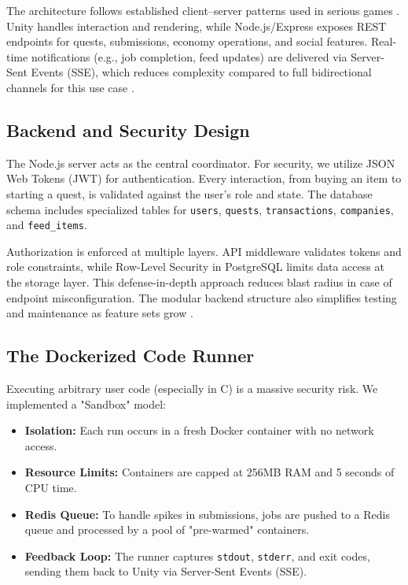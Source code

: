 \documentclass[a4paper, UKenglish, cleveref, autoref, thm-restate]{oasics-v2021}
\begin{document}
The architecture follows established client--server patterns used in serious games \cite{khan2010clientserver}. Unity handles interaction and rendering, while Node.js/Express exposes REST endpoints for quests, submissions, economy operations, and social features. Real-time notifications (e.g., job completion, feed updates) are delivered via Server-Sent Events (SSE), which reduces complexity compared to full bidirectional channels for this use case \cite{torre2019sse}.

\subsection{Backend and Security Design}
The Node.js server acts as the central coordinator. For security, we utilize JSON Web Tokens (JWT) for authentication. Every interaction, from buying an item to starting a quest, is validated against the user's role and state. The database schema includes specialized tables for \texttt{users}, \texttt{quests}, \texttt{transactions}, \texttt{companies}, and \texttt{feed\_items}.

Authorization is enforced at multiple layers. API middleware validates tokens and role constraints, while Row-Level Security in PostgreSQL limits data access at the storage layer. This defense-in-depth approach reduces blast radius in case of endpoint misconfiguration. The modular backend structure also simplifies testing and maintenance as feature sets grow \cite{chaplia2023node}.

\subsection{The Dockerized Code Runner}
Executing arbitrary user code (especially in C) is a massive security risk. We implemented a "Sandbox" model:
\begin{itemize}
    \item \textbf{Isolation:} Each run occurs in a fresh Docker container with no network access.
    \item \textbf{Resource Limits:} Containers are capped at 256MB RAM and 5 seconds of CPU time.
    \item \textbf{Redis Queue:} To handle spikes in submissions, jobs are pushed to a Redis queue and processed by a pool of "pre-warmed" containers.
    \item \textbf{Feedback Loop:} The runner captures \texttt{stdout}, \texttt{stderr}, and exit codes, sending them back to Unity via Server-Sent Events (SSE).
\end{itemize}
\end{document}
